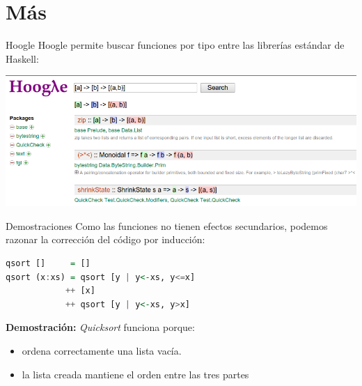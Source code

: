 \section{Más}

\begin{frame}[fragile]{Hoogle}
  Hoogle permite buscar funciones por tipo entre las librerías
  estándar de Haskell:
  
  \begin{center}
  \includegraphics[scale=0.35]{./images/hoogle.png}
  \end{center}
\end{frame}


\begin{frame}[fragile]{Demostraciones}
  Como las funciones no tienen efectos secundarios, podemos razonar la
  corrección del código por inducción:

  \begin{lstlisting}[language=haskell]
qsort []     = []
qsort (x:xs) = qsort [y | y<-xs, y<=x]
            ++ [x]
            ++ qsort [y | y<-xs, y>x]
  \end{lstlisting}

  \textbf{Demostración:} \textit{Quicksort} funciona porque:
  \begin{itemize}
   \item ordena correctamente una lista vacía.
   \item la lista creada mantiene el orden entre las tres partes
  \end{itemize}
\end{frame}


